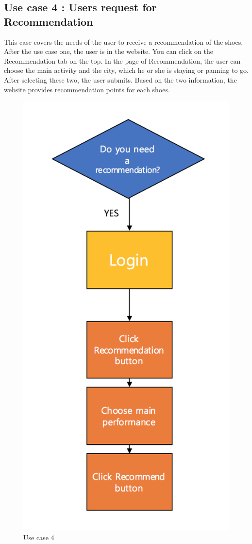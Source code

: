 \documentclass[conference]{IEEEtran}
\begin{document}
\subsection{Use case 4 : Users request for Recommendation} This case covers the needs of the user to receive a recommendation of the shoes. After the use case one, the user is in the website. You can click on the Recommendation tab on the top. In the page of Recommendation, the user can choose the main activity and the city, which he or she is staying or panning to go. After selecting these two, the user submits. Based on the two information, the website provides recommendation points for each shoes.
\begin{figure}[h]
\begin{center}
    \includegraphics[scale=0.6]{usecase4}
    \caption{Use case 4} \label{fig:label}
\end{center}
\end{figure}
\end{document}
